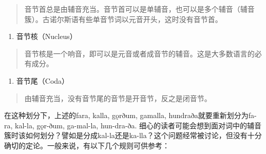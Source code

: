 \begin{quote}
  音节首总是由辅音充当。音节首可以是单辅音，也可以是多个辅音（辅音簇）。古诺尔斯语有些单音节词以元音开头，这时没有音节首。
\end{quote}

\begin{enumerate}
  \def\labelenumi{\arabic{enumi}.}
  \setcounter{enumi}{1}
  \item
        音节核（Nucleus）
\end{enumerate}

\begin{quote}
  音节核是一个响音，即可以是元音或者成音节的辅音。这是大多数语言的必有成分。
\end{quote}

\begin{enumerate}
  \def\labelenumi{\arabic{enumi}.}
  \setcounter{enumi}{2}
  \item
        音节尾（Coda）
\end{enumerate}

\begin{quote}
  由辅音充当，没有音节尾的音节是开音节，反之是闭音节。
\end{quote}

在这种划分下，上述的fara, kalla, gǫrðum, gamalla,
hundraða就要重新划分为fa-ra, kal-la, gǫr-ðum, ga-mal-la, hun-dra-ða.
细心的读者可能会想到面对词中的辅音簇时该如何划分？譬如是分成kal-la还是ka-lla？这个问题经常被讨论，但没有十分确切的定论。一般来说，有以下几个规则可供参考：


